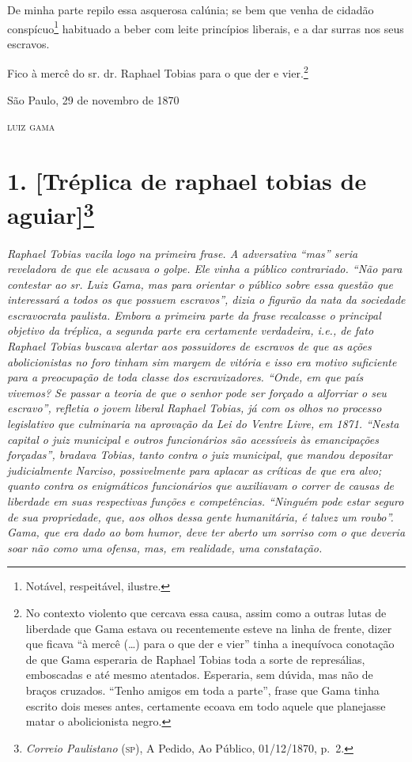 {De minha parte repilo essa asquerosa calúnia; se bem que venha de
cidadão conspícuo\footnote{ Notável, respeitável, ilustre.}
habituado a beber com leite princípios liberais, e a dar surras nos seus
escravos.

Fico à mercê do sr. dr. Raphael Tobias para o que der e vier.\footnote{
  No contexto violento que cercava essa causa, assim como a outras lutas
  de liberdade que Gama estava ou recentemente esteve na linha de
  frente, dizer que ficava ``à mercê (\ldots) para o que der e vier''
  tinha a inequívoca conotação de que Gama esperaria de Raphael Tobias
  toda a sorte de represálias, emboscadas e até mesmo atentados.
  Esperaria, sem dúvida, mas não de braços cruzados. ``Tenho amigos em
  toda a parte'', frase que Gama tinha escrito dois meses antes,
  certamente ecoava em todo aquele que planejasse matar o abolicionista
  negro.}

\begin{flushright}
São Paulo, 29 de novembro de 1870

\textsc{luiz gama}
\end{flushright}

\chapter{1. {[}Tréplica de raphael tobias de aguiar{]}\footnote{\emph{Correio Paulistano} (\textsc{sp}), A Pedido, Ao Público,
  01/12/1870, p.~2.}} %

\begin{didascalia}
\emph{Raphael Tobias vacila logo na primeira frase. A adversativa ``mas''
seria reveladora de que ele acusava o golpe. Ele vinha a público
contrariado. ``Não para contestar ao sr. Luiz Gama, mas para orientar o
público sobre essa questão que interessará a todos os que possuem
escravos'', dizia o figurão da nata da sociedade escravocrata paulista.
Embora a primeira parte da frase recalcasse o principal objetivo da
tréplica, a segunda parte era certamente verdadeira, i.e., de fato
Raphael Tobias buscava alertar aos possuidores de escravos de que as
ações abolicionistas no foro tinham sim margem de vitória e isso era
motivo suficiente para a preocupação de toda classe dos escravizadores.
``Onde, em que país vivemos? Se passar a teoria de que o senhor pode ser
forçado a alforriar o seu escravo'', refletia o jovem liberal Raphael
Tobias, já com os olhos no processo legislativo que culminaria na
aprovação da Lei do Ventre Livre, em 1871. ``Nesta capital o juiz
municipal e outros funcionários são acessíveis às emancipações
forçadas'', bradava Tobias, tanto contra o juiz municipal, que mandou
depositar judicialmente Narciso, possivelmente para aplacar as críticas
de que era alvo; quanto contra os enigmáticos funcionários que
auxiliavam o correr de causas de liberdade em suas respectivas funções e
competências. ``Ninguém pode estar seguro de sua propriedade, que, aos
olhos dessa gente humanitária, é talvez um roubo''. Gama, que era dado ao
bom humor, deve ter aberto um sorriso com o que deveria soar não como
uma ofensa, mas, em realidade, uma constatação.}
\end{didascalia}

}
